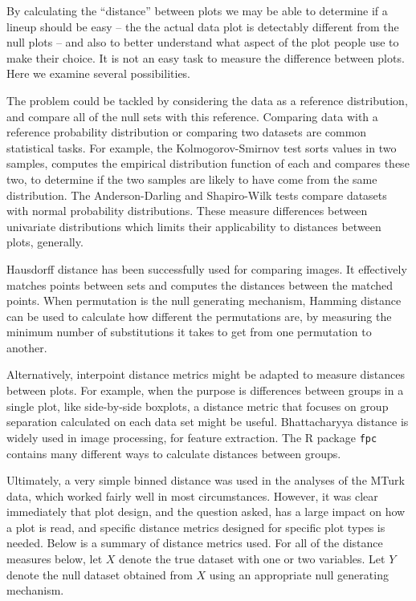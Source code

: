 \documentclass[12]{article}
\begin{document}
By calculating the ``distance'' between plots we may be able to determine if a lineup should be easy -- the the actual data plot is detectably different from the null plots -- and also to better understand what aspect of the plot people use to make their choice. It is not an easy task to measure the difference between plots. Here we examine several possibilities. 

The problem could be tackled by considering the data as a reference distribution, and compare all of the null sets with this reference. Comparing data with a reference probability distribution or comparing two datasets are common statistical tasks. For example, the Kolmogorov-Smirnov test \citep{stephens:1974} sorts values in two samples, computes the empirical distribution function of each and compares these two, to determine if the two samples are likely to have come from the same distribution.  The Anderson-Darling \citep{stephens:1974} and Shapiro-Wilk \citep{shapiro:1965} tests compare datasets with normal probability distributions. These measure differences between univariate distributions which limits their applicability to distances between plots, generally. 

Hausdorff distance \citep{huttenlocher:1993} has been successfully used for comparing images. It effectively matches points between sets and computes the distances between the matched points. When permutation is the null generating mechanism, Hamming distance \citep{hamming:1950} can be used to calculate how different the permutations are, by measuring the minimum number of substitutions it takes to get from one permutation to another. 

Alternatively, interpoint distance metrics might be adapted to measure distances between plots. For example, when the purpose is differences between groups in a single plot, like side-by-side boxplots, a distance metric that focuses on group separation calculated on each data set might be useful. Bhattacharyya distance \citep{bhattacharyya:1946} is widely used in image processing, for feature extraction. The R package {\tt fpc} \cite{hennig:2010} contains many different ways to calculate distances between groups. 

Ultimately, a very simple binned distance was used in the analyses of the MTurk data, which worked fairly well in most circumstances. However, it was clear immediately that plot design, and the question asked, has a large impact on how a plot is read, and specific distance metrics designed for specific plot types is needed. Below is a summary of distance metrics used. For all of the distance measures below, let $X$ denote the true dataset with one or two variables. Let $Y$ denote the null dataset obtained from $X$ using an appropriate null generating mechanism.
\end{document}
